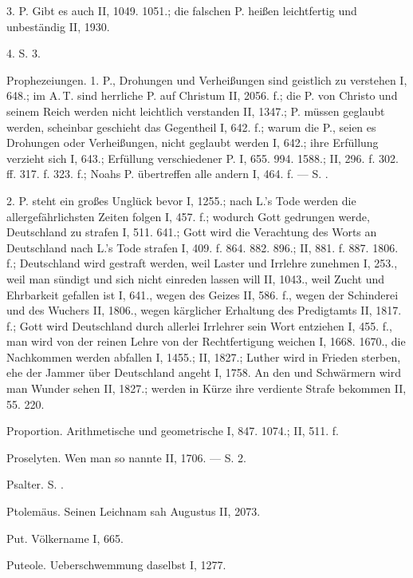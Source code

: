 3. P.  Gibt es auch II, 1049. 1051.; die falschen P. heißen leichtfertig und unbeständig II, 1930.

4.  S.  3.

Prophezeiungen. 1.  P., Drohungen und Verheißungen sind geistlich zu verstehen I, 648.; im A.\,T. sind herrliche P. auf Christum II, 2056. f.; die P. von Christo und seinem Reich werden nicht leichtlich verstanden II, 1347.; P. müssen geglaubt werden, scheinbar geschieht das Gegentheil I, 642. f.; warum die P., seien es Drohungen oder Verheißungen, nicht geglaubt werden I, 642.; ihre Erfüllung verzieht sich I, 643.; Erfüllung verschiedener P. I, 655. 994. 1588.; II, 296. f. 302. ff. 317. f. 323. f.; Noahs P. übertreffen alle andern I, 464. f. — S. .

2.  P.  steht ein großes Unglück bevor I, 1255.; nach L.’s Tode werden die allergefährlichsten Zeiten folgen I, 457. f.; wodurch Gott gedrungen werde, Deutschland zu strafen I, 511. 641.; Gott wird die Verachtung des Worts an Deutschland nach L.’s Tode strafen I, 409. f. 864. 882. 896.; II, 881. f. 887. 1806. f.; Deutschland wird gestraft werden, weil Laster und Irrlehre zunehmen I, 253., weil man sündigt und sich nicht einreden lassen will II, 1043., weil Zucht und Ehrbarkeit gefallen ist I, 641., wegen des Geizes II, 586. f., wegen der Schinderei und des Wuchers II, 1806., wegen kärglicher Erhaltung des Predigtamts II, 1817. f.; Gott wird Deutschland durch allerlei Irrlehrer sein Wort entziehen I, 455. f., man wird von der reinen Lehre von der Rechtfertigung weichen I, 1668. 1670., die Nachkommen werden abfallen I, 1455.; II, 1827.; Luther wird in Frieden sterben, ehe der Jammer über Deutschland angeht I, 1758. An den  und Schwärmern wird man Wunder sehen II, 1827.;  werden in Kürze ihre verdiente Strafe bekommen II, 55. 220.

Proportion. Arithmetische und geometrische I, 847. 1074.; II, 511. f.

Proselyten. Wen man so nannte II, 1706. — S.  2.

Psalter. S. .

Ptolemäus. Seinen Leichnam sah Augustus II, 2073.

Put. Völkername I, 665.

Puteole. Ueberschwemmung daselbst I, 1277.


